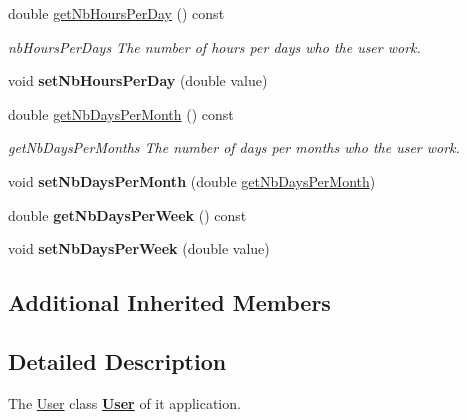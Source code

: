 \begin{DoxyCompactItemize}
double \hyperlink{classModels_1_1User_a5ebdd9899c343c828d03c74045aa6989}{get\-Nb\-Hours\-Per\-Day} () const 
\begin{DoxyCompactList}\small\item\em nb\-Hours\-Per\-Days The number of hours per days who the user work. \end{DoxyCompactList}\item 
\hypertarget{classModels_1_1User_a1fcef9f88da89f808a5a2225ca11c809}{void {\bfseries set\-Nb\-Hours\-Per\-Day} (double value)}\label{classModels_1_1User_a1fcef9f88da89f808a5a2225ca11c809}

\item 
double \hyperlink{classModels_1_1User_a264cf13078c59b3f676e038db2dffc2e}{get\-Nb\-Days\-Per\-Month} () const 
\begin{DoxyCompactList}\small\item\em get\-Nb\-Days\-Per\-Months The number of days per months who the user work. \end{DoxyCompactList}\item 
\hypertarget{classModels_1_1User_ac68ad7cdc7da220cbb03d99dffd6d774}{void {\bfseries set\-Nb\-Days\-Per\-Month} (double \hyperlink{classModels_1_1User_a264cf13078c59b3f676e038db2dffc2e}{get\-Nb\-Days\-Per\-Month})}\label{classModels_1_1User_ac68ad7cdc7da220cbb03d99dffd6d774}

\item 
\hypertarget{classModels_1_1User_a5e3d5058a495cf15d2741b788bc971c1}{double {\bfseries get\-Nb\-Days\-Per\-Week} () const }\label{classModels_1_1User_a5e3d5058a495cf15d2741b788bc971c1}

\item 
\hypertarget{classModels_1_1User_a463e429e22f908f304d66fc22e48fc8e}{void {\bfseries set\-Nb\-Days\-Per\-Week} (double value)}\label{classModels_1_1User_a463e429e22f908f304d66fc22e48fc8e}

\end{DoxyCompactItemize}
\subsection*{Additional Inherited Members}


\subsection{Detailed Description}
The \hyperlink{classModels_1_1User}{User} class {\bfseries \hyperlink{classModels_1_1User}{User}} of it application. 

